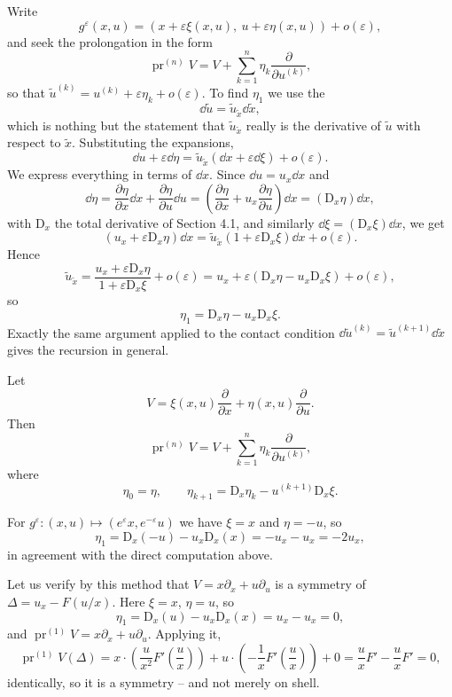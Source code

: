 \documentclass[a4paper]{scrartcl}
\newcommand{\D}{\mathrm{D}}
\newcommand{\pr}{\operatorname{pr}}
\begin{document}
Write
$$
g^\varepsilon(x,u) = \left(x + \varepsilon\xi(x,u),\ u + \varepsilon\eta(x,u)\right) + o(\varepsilon),
$$
and seek the prolongation in the form
$$
\pr^{(n)}V = V + \sum_{k=1}^n\eta_k\frac{\partial}{\partial u^{(k)}},
$$
so that $\tilde u^{(k)} = u^{(k)} + \varepsilon\eta_k + o(\varepsilon)$. To find $\eta_1$ we use the 
$$
\dd\tilde u = \tilde u_{\tilde x}\dd\tilde x,
$$
which is nothing but the statement that $\tilde u_{\tilde x}$ really is the derivative of $\tilde u$ with respect to $\tilde x$. Substituting the expansions,
$$
\dd u + \varepsilon\dd\eta = \tilde u_{\tilde x}\left(\dd x + \varepsilon\dd\xi\right) + o(\varepsilon).
$$
We express everything in terms of $\dd x$. Since $\dd u = u_x\dd x$ and
$$
\dd\eta = \frac{\partial\eta}{\partial x}\dd x + \frac{\partial\eta}{\partial u}\dd u = \left(\frac{\partial\eta}{\partial x} + u_x\frac{\partial\eta}{\partial u}\right)\dd x = \left(\D_x\eta\right)\dd x,
$$
with $\D_x$ the total derivative of Section 4.1, and similarly $\dd\xi = (\D_x\xi)\dd x$, we get
$$
\left(u_x + \varepsilon\D_x\eta\right)\dd x = \tilde u_{\tilde x}\left(1 + \varepsilon\D_x\xi\right)\dd x + o(\varepsilon).
$$
Hence
$$
\tilde u_{\tilde x} = \frac{u_x + \varepsilon\D_x\eta}{1+\varepsilon\D_x\xi} + o(\varepsilon) = u_x + \varepsilon\left(\D_x\eta - u_x\D_x\xi\right) + o(\varepsilon),
$$
so
$$
\eta_1 = \D_x\eta - u_x\D_x\xi.
$$
Exactly the same argument applied to the contact condition $\dd\tilde u^{(k)} = \tilde u^{(k+1)}\dd\tilde x$ gives the recursion in general.

\begin{proposition}
	Let
	$$
	V = \xi(x,u)\frac{\partial}{\partial x} + \eta(x,u)\frac{\partial}{\partial u}.
	$$
	Then
	$$
	\pr^{(n)}V = V + \sum_{k=1}^n\eta_k\frac{\partial}{\partial u^{(k)}},
	$$
	where
	$$
	\eta_0 = \eta, \qquad \eta_{k+1} = \D_x\eta_k - u^{(k+1)}\D_x\xi.
	$$
\end{proposition}

\begin{example}
	For $g^\varepsilon : (x,u)\mapsto(e^\varepsilon x, e^{-\varepsilon}u)$ we have $\xi = x$ and $\eta = -u$, so
	$$
	\eta_1 = \D_x(-u) - u_x\D_x(x) = -u_x - u_x = -2u_x,
	$$
	in agreement with the direct computation above.
\end{example}

\begin{example}
	Let us verify by this method that $V = x\partial_x + u\partial_u$ is a symmetry of $\Delta = u_x - F(u/x)$. Here $\xi = x$, $\eta = u$, so
	$$
	\eta_1 = \D_x(u) - u_x\D_x(x) = u_x - u_x = 0,
	$$
	and $\pr^{(1)}V = x\partial_x + u\partial_u$. Applying it,
	$$
	\pr^{(1)}V(\Delta) = x\cdot\left(\frac{u}{x^2}F'\!\left(\frac ux\right)\right) + u\cdot\left(-\frac1xF'\!\left(\frac ux\right)\right) + 0 = \frac uxF' - \frac uxF' = 0,
	$$
	identically, so it is a symmetry -- and not merely on shell.
\end{example}
\end{document}
